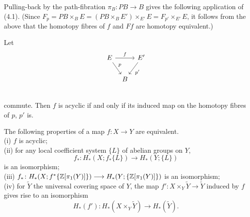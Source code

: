 Pulling-back by the path-fibration $\pi_B \colon   PB \longrightarrow B$ gives the following application of (4.1). (Since $F_p = PB \times_B E = (PB\times_B E') \times_{E'} E = F_{p'} \times_{E'} E$, it follows from the above that the homotopy fibres of
$f$ and $Ff$ are homotopy equivalent.) 
\begin{prop}
  Let
\[
\begin{tikzcd}[column sep=tiny]
E \arrow{rr}{f} \arrow{dr}{p} & &E' \arrow{dl}{p'} \\
& B & \\
\end{tikzcd}
\]
commute. Then $f$ is acyclic if and only if its induced map on the homotopy fibres of $p$, $p'$ is.
\end{prop}
 \begin{prop}
   The following properties of a map $f\colon   X\longrightarrow Y $ are equivalent.\\
(i) $f$ is acyclic; \\
(ii) for any local coefficient system $\{L\}$ of abelian groups on $Y$,
\[f_*\colon  H_*(X; f_*\{L\})\longrightarrow H_*(Y;\{L\})\]
is an isomorphism;\\
(iii) $f_* \colon   H_*(X; f^*\{\mathbb{Z}[\pi_1(Y)]\})\longrightarrow H_*(Y;\{\mathbb{Z}[\pi_1(Y)]\})$ is an isomorphism;\\
(iv) for $\widetilde{Y}$ the universal covering space of $Y$, the map $f' \colon   X\times_Y \widetilde{Y} \longrightarrow \widetilde{Y}$ induced by $f$ gives rise to an isomorphism
\[H_*(f')\colon   H_*(X\times_Y\widetilde{Y})\longrightarrow H_*(\widetilde{Y}).\]
 \end{prop}

